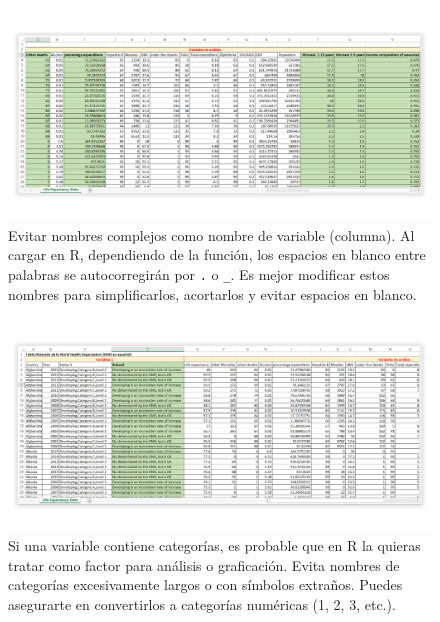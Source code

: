 \documentclass[
]{article}
\theoremstyle{definition}
\theoremstyle{definition}
\theoremstyle{definition}
\theoremstyle{definition}
\theoremstyle{remark}
\begin{document}
\begin{figure}

{\centering \includegraphics[width=1\linewidth]{figs/screenshots/excel3} 

}

\caption{Evitar nombres complejos como nombre de variable (columna). Al cargar en R, dependiendo de la función, los espacios en blanco entre palabras se autocorregirán por \texttt{.} o \texttt{\_}. Es mejor modificar estos nombres para simplificarlos, acortarlos y evitar espacios en blanco.}\label{fig:figura54}
\end{figure}



\begin{figure}

{\centering \includegraphics[width=1\linewidth]{figs/screenshots/excel4} 

}

\caption{Si una variable contiene categorías, es probable que en R la quieras tratar como factor para análisis o graficación. Evita nombres de categorías excesivamente largos o con símbolos extraños. Puedes asegurarte en convertirlos a categorías numéricas (1, 2, 3, etc.).}\label{fig:figura55}
\end{figure}
\end{document}
